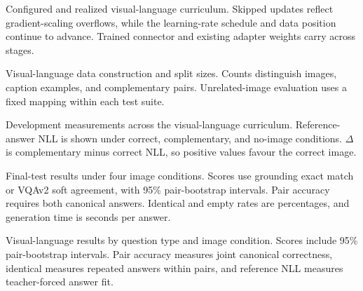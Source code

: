 \documentclass{article}
\begin{document}
\begin{table}[ht]
\centering\scriptsize
\resizebox{\linewidth}{!}{}
\caption{Configured and realized visual-language curriculum. Skipped updates reflect gradient-scaling overflows, while the learning-rate schedule and data position continue to advance. Trained connector and existing adapter weights carry across stages.}
\label{tab:a2-curriculum}
\end{table}

\begin{table}[ht]
\centering\small

\caption{Visual-language data construction and split sizes. Counts distinguish images, caption examples, and complementary pairs. Unrelated-image evaluation uses a fixed mapping within each test suite.}
\label{tab:a2-data}
\end{table}

\begin{table}[ht]
\centering\small
\resizebox{\linewidth}{!}{}
\caption{Development measurements across the visual-language curriculum. Reference-answer NLL is shown under correct, complementary, and no-image conditions. \(\Delta\) is complementary minus correct NLL, so positive values favour the correct image.}
\label{tab:a2-dev}
\end{table}

\begin{table}[ht]
\centering\small
\resizebox{\linewidth}{!}{}
\caption{Final-test results under four image conditions. Scores use grounding exact match or VQAv2 soft agreement, with 95\% pair-bootstrap intervals. Pair accuracy requires both canonical answers. Identical and empty rates are percentages, and generation time is seconds per answer.}
\label{tab:t2-final}
\end{table}

\begin{table}[ht]
\centering\small

\caption{Visual-language results by question type and image condition. Scores include 95\% pair-bootstrap intervals. Pair accuracy measures joint canonical correctness, identical measures repeated answers within pairs, and reference NLL measures teacher-forced answer fit.}
\label{tab:a2-bytype}
\end{table}
\end{document}
